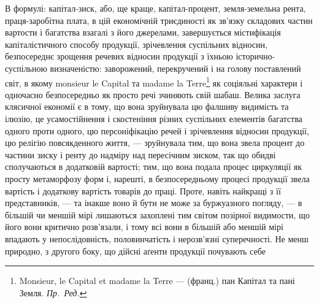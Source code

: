 В формулі: капітал-зиск, або, ще краще, капітал-процент, земля-земельна
рента, праця-заробітна плата, в цій економічній триєдиності як зв’язку
складових частин вартости і багатства взагалі з його джерелами, завершується
містифікація капіталістичного способу продукції, зрічевлення суспільних відносин,
безпосереднє зрощення речевих відносин продукції з їхньою історично-суспільною
визначеністю: заворожений, перекручений і на голову поставлений
світ, в якому monsieur le Capital та madame la Terre\footnote*{
Monsieur, le Capital et madame la Terre — (франц.) пан Капітал та пані Земля. \emph{Пр.~Ред.}
} як соціяльні характери
і одночасно безпосередньо як просто речі зчиняють свій шабаш. Велика заслуга
клясичної економії є в тому, що вона зруйнувала цю фалшиву видимість
та ілюзію, це усамостійнення і скостеніння різних суспільних елементів
багатства одного проти одного, цю персоніфікацію речей і зрічевлення
відносин продукції, цю релігію повсякденного життя, — зруйнувала тим, що вона
звела процент до частини зиску і ренту до надміру над пересічним зиском, так
що обидві сполучаються в додатковій вартості; тим, що вона подала процес
циркуляції як просту метаморфозу форм і, нарешті, в безпосередньому процесі
продукції звела вартість і додаткову вартість товарів до праці. Проте, навіть
найкращі з її представників, — та інакше воно й бути не може за буржуазного
погляду, — в більшій чи меншій мірі лишаються захоплені тим світом позірної
видимости, що його вони критично розв’язали, і тому всі вони в більшій або меншій
мірі впадають у непослідовність, половинчатість і нерозв’язні суперечності.
Не менш природно, з другого боку, що дійсні аґенти продукції почувають себе
\parbreak{}  %
